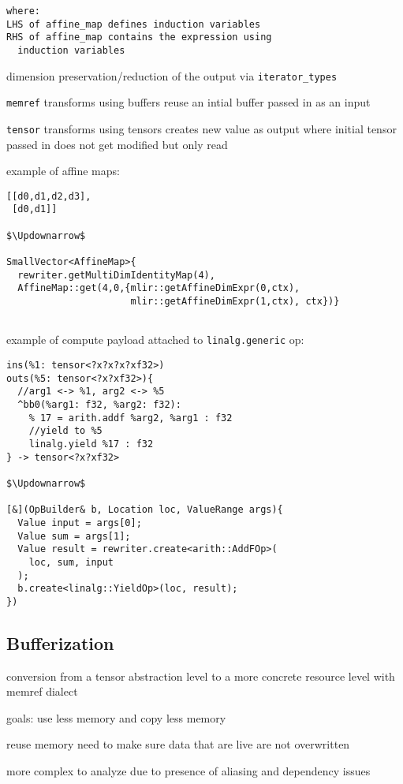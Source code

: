 \documentclass[8pt]{extarticle}
\begin{document}
\begin{multicols*}{2}
\begin{lstlisting}
where:
LHS of affine_map defines induction variables
RHS of affine_map contains the expression using
  induction variables
\end{lstlisting}

dimension preservation/reduction of the output via \verb|iterator_types|

\verb|memref| transforms using buffers reuse an intial buffer passed in as an input

\verb|tensor| transforms using tensors creates new value as output where initial tensor passed in does not get modified but only read

example of affine maps:

\begin{lstlisting}
[[d0,d1,d2,d3],
 [d0,d1]]

$\Updownarrow$

SmallVector<AffineMap>{
  rewriter.getMultiDimIdentityMap(4),
  AffineMap::get(4,0,{mlir::getAffineDimExpr(0,ctx),
                      mlir::getAffineDimExpr(1,ctx), ctx})}
 
\end{lstlisting}

example of compute payload attached to \verb|linalg.generic| op:

\begin{lstlisting}
ins(%1: tensor<?x?x?x?xf32>)
outs(%5: tensor<?x?xf32>){
  //arg1 <-> %1, arg2 <-> %5
  ^bb0(%arg1: f32, %arg2: f32):
    % 17 = arith.addf %arg2, %arg1 : f32
    //yield to %5
    linalg.yield %17 : f32
} -> tensor<?x?xf32>

$\Updownarrow$

[&](OpBuilder& b, Location loc, ValueRange args){
  Value input = args[0];
  Value sum = args[1];
  Value result = rewriter.create<arith::AddFOp>(
    loc, sum, input
  );
  b.create<linalg::YieldOp>(loc, result);
})
\end{lstlisting}

\subsection{Bufferization}

conversion from a tensor abstraction level to a more concrete resource level with memref dialect

goals: use less memory and copy less memory

reuse memory need to make sure data that are live are not overwritten

more complex to analyze due to presence of aliasing and dependency issues


\end{multicols*}
\end{document}
